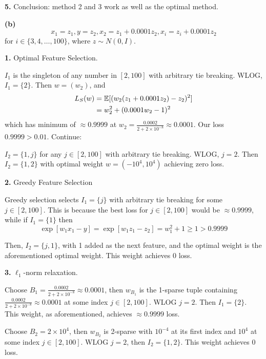 \documentclass[a4paper, 10pt]{article}
\begin{document}
\begin{problem} [Problem 1]
    \textbf{5.} Conclusion: method 2 and 3 work as well as the optimal method.

    \textbf{(b)} \begin{equation*}
    x_1 = z_1, y = z_2, x_2 = z_1 + 0.0001 z_2, x_i = z_i + 0.0001z_2
    \end{equation*}
    for $i \in \{3, 4, \ldots, 100\}$, where $z \sim N(0, I)$.

    \textbf{1.} Optimal Feature Selection.

    $I_1$ is the singleton of any number in $[2, 100]$ with arbitrary tie breaking. WLOG, $I_1 = \{2\}$. Then $w = (w_2)$, and 
    \begin{align*}
    L_S(w) &= \mathbb{E}[(w_2(z_1 + 0.0001z_2) - z_2)^2] \\
    &= w_2^2 + (0.0001w_2 - 1)^2
    \end{align*}
    which has minimum of $\approx 0.9999$ at $w_2 = \frac{0.0002}{2 + 2 \times 10^{-8}} \approx 0.0001$. Our loss $0.9999 > 0.01$. Continue:

    $I_2 = \{1, j\}$ for any $j \in [2, 100]$ with arbitrary tie breaking. WLOG, $j = 2$. Then $I_2 = \{1, 2\}$ with optimal weight $w = (-10^4, 10^4)$ achieving zero loss.

    \textbf{2.} Greedy Feature Selection

    Greedy selection selects $I_1 = \{j\}$ with arbitrary tie breaking for some $j \in [2, 100]$. This is because the best loss for $j \in [2, 100]$ would be $\approx 0.9999$, while if $I_1 = \{1\}$ then \begin{equation*}
    \exp[w_1 x_1 - y] = \exp[w_1 z_1 - z_2] = w_1^2 + 1 \geq 1 > 0.9999
    \end{equation*}

    Then, $I_2 = \{j, 1\}$, with 1 added as the next feature, and the optimal weight is the aforementioned optimal weight. This weight achieves 0 loss.

    \textbf{3.} $\ell_1$-norm relaxation.

    Choose $B_1 =  \frac{0.0002}{2 + 2 \times 10^{-8}} \approx 0.0001$, then $w_{B_1}$ is the 1-sparse tuple containing $\frac{0.0002}{2 + 2 \times 10^{-8}} \approx 0.0001$ at some index $j \in [2, 100]$. WLOG $j = 2$. Then $I_1 = \{2\}$. This weight, as aforementioned, achieves $\approx 0.9999$ loss.

    Choose $B_2 = 2 \times 10^4$, then $w_{B_2}$ is 2-sparse with $10^{-4}$ at its first index and $10^4$ at some index $j \in [2, 100]$. WLOG $j = 2$, then $I_2 = \{1, 2\}$. This weight achieves 0 loss.


\end{problem}
\end{document}
